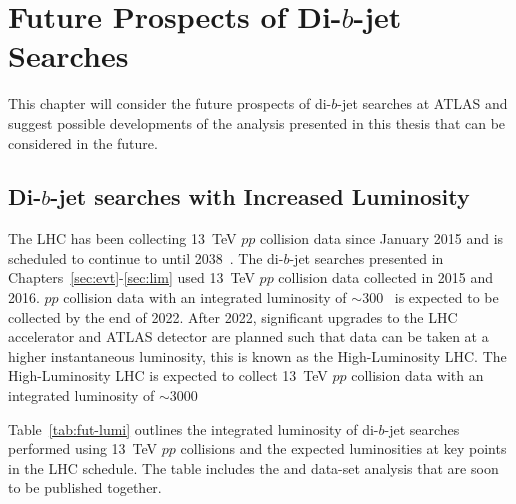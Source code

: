 \chapter{Future Prospects of Di-$b$-jet Searches}
\label{sec:fut}

This chapter will consider the future prospects of di-$b$-jet searches at ATLAS
and suggest possible developments of the analysis presented in this thesis
that can be considered in the future.

\section{Di-$b$-jet searches with Increased Luminosity}

The LHC has been collecting 13~TeV $pp$ collision data since January 2015 and is scheduled to continue to until 2038~\cite{fut-lhc-shedule}.
The di-$b$-jet searches presented in Chapters~\ref{sec:evt}-\ref{sec:lim} used 13~TeV $pp$ collision data collected in 2015 and 2016.
$pp$ collision data with an integrated luminosity of $\sim$300~\ifb{} is expected to be collected by the end of 2022.
After 2022, significant upgrades to the LHC accelerator and ATLAS detector are planned such that data can be taken at a higher instantaneous luminosity,
this is known as the High-Luminosity LHC.
The High-Luminosity LHC is expected to collect 13~TeV $pp$ collision data with an integrated luminosity of $\sim$3000~\ifb{}

Table~\ref{tab:fut-lumi} outlines the integrated luminosity of di-$b$-jet searches performed
using 13~TeV $pp$ collisions and the expected luminosities at key points in the LHC schedule.
The table includes the \lm{} and \hm{} data-set analysis that are soon to be published together.

